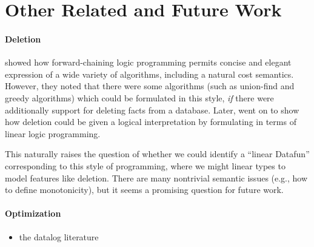 
\section{Other Related and Future Work}
\label{sec:futurework}

\paragraph{Deletion} \citet{logical-algorithms} showed how
forward-chaining logic programming permits concise and elegant
expression of a wide variety of algorithms, including a natural cost
semantics. However, they noted that there were some algorithms (such
as union-find and greedy algorithms) which could be formulated in this
style, \emph{if} there were additionally support for deleting facts
from a database. Later, \citet{linear-logical-algorithms} went on to
show how deletion could be given a logical interpretation by
formulating in terms of linear logic programming.

This naturally raises the question of whether we could identify a
``linear Datafun'' corresponding to this style of programming, where
we might linear types to model features like deletion. There are many
nontrivial semantic issues (e.g., how to define monotonicity), but
it seems a promising question for future work.



\paragraph{Optimization}
\begin{itemize}
\item \TODO the datalog literature
\end{itemize}
